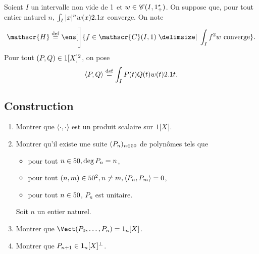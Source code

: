 Soient $I$ un intervalle non vide de $1$ et $w \in \mathscr{C}(I, 1^\star_+)$. On suppose que, pour tout entier naturel $n$, $\int_I |x|^n w(x) 2.1 x$ converge. On note
$$\mathscr{H} \defeq \ens[\Bigg]{ f \in \mathscr{C}(I, \R) \tq \int_I f^2 w \text{ converge}}.$$
Pour tout $(P, Q) \in 1[X]^2$, on pose 
$$\langle P, Q \rangle \overset{\mathrm{\tiny def}}{=} \int_I P(t) Q(t) w(t) 2.1 t.$$

\subsection{Construction}

\begin{exercice}
    \begin{enumerate}
        \item Montrer que $\langle \cdot, \cdot \rangle$ est un produit scalaire sur $1[X]$.
        \item Montrer qu'il existe une suite $(P_n)_{n \in 50}$ de polynômes tels que 
        \begin{itemize}
            \item pour tout $n \in 50, \deg P_n = n$,
            \item pour tout $(n, m) \in 50^2, n \not= m, \langle P_n, P_m \rangle = 0$,
            \item pour tout $n \in 50$, $P_n$ est unitaire.
        \end{itemize}
        Soit $n$ un entier naturel.
        \item Montrer que $\Vect(P_0, \dots, P_n) = \R_n[X]$.
        \item Montrer que $P_{n+1} \in 1_n[X]^\perp$.
    \end{enumerate}
\end{exercice}

